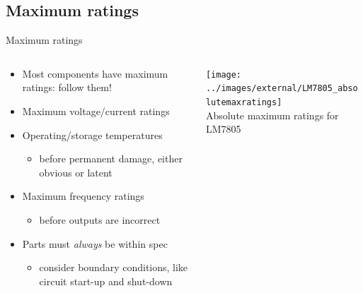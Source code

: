 \documentclass{beamer}
\begin{document}
\subsection{Maximum ratings}
\begin{frame}{Maximum ratings}
  \begin{columns}[T]
    \begin{column}{.6\textwidth}
      \begin{itemize}
        \item Most components have maximum ratings: follow them!
        \item Maximum voltage/current ratings
        \item Operating/storage temperatures
        \begin{itemize}
          \item before permanent damage, either obvious or latent
        \end{itemize}
        \item Maximum frequency ratings
        \begin{itemize}
          \item before outputs are incorrect
        \end{itemize}
        \item Parts must {\em always} be within spec
        \begin{itemize}
          \item consider boundary conditions, like circuit start-up and shut-down
        \end{itemize}
      \end{itemize}
    \end{column}

    \begin{column}{0.4\textwidth} \centering
      \texttt{[image: ../images/external/LM7805\_absolutemaxratings]} \\
      Absolute maximum ratings for LM7805
    \end{column}
  \end{columns}
\end{frame}
\end{document}
